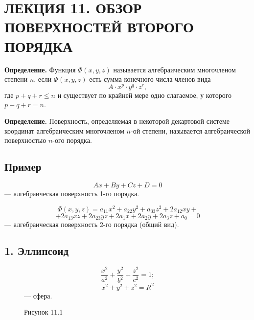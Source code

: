 \documentclass[12pt,a4paper]{article}
\begin{document}
\setcounter{page}{79}

\section*{ЛЕКЦИЯ 11. ОБЗОР ПОВЕРХНОСТЕЙ ВТОРОГО ПОРЯДКА}

\textbf{Определение.} Функция $\Phi(x,y,z)$ называется алгебраическим
многочленом степени $n$, если $\Phi(x,y,z)$ есть сумма конечного
числа членов вида
$$
A\cdot x^p\cdot y^q\cdot z^r,
$$
где $p+q+r\le n$ и существует по крайней мере одно слагаемое, у
которого $p+q+r=n$.

\textbf{Определение.} Поверхность, определяемая в некоторой
декартовой системе координат алгебраическим многочленом $n$-ой
степени, называется алгебраической поверхностью $n$-ого порядка.

\subsection*{\textbf{Пример}}

$$
Ax+By+Cz+D=0
$$
--- алгебраическая поверхность 1-го порядка.

$$
\Phi(x,y,z)=a_{11}x^2+a_{22}y^2+a_{33}z^2+2a_{12}xy+
$$
$$
+2a_{13}xz+2a_{23}yz+2a_1x+2a_2y+2a_3z+a_0=0
$$
--- алгебраическая поверхность 2-го порядка (общий вид).

\subsection*{\textbf{1. Эллипсоид}}

\begin{figure}[H]
  \centering
  \begin{minipage}{0.4\textwidth}
    \centering
    \caption*{Рисунок 11.1}
  \end{minipage}%
  \begin{minipage}{0.55\textwidth}
    $$
    \frac{x^2}{a^2}+\frac{y^2}{b^2}+\frac{z^2}{c^2}=1;
    $$
    $$
    x^2+y^2+z^2=R^2
    $$
    --- сфера.
  \end{minipage}
\end{figure}
\end{document}
